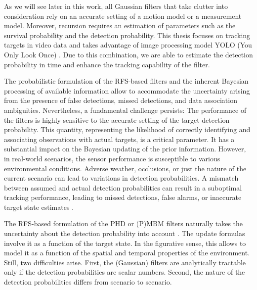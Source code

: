 As we will see later in this work, all Gaussian filters that take clutter into consideration rely on an accurate
setting
of a motion model or a measurement model. Moreover, recursion requires an estimation of parameters such as
the survival probability and the detection probability. This thesis focuses on tracking targets in video
data and takes advantage of image processing model YOLO (You Only Look Once) \cite{yanYolo2023}. Due to this combination, we are able to
estimate the detection probability in time and enhance the tracking capability of the filter.

The probabilistic formulation of the RFS-based filters and the inherent Bayesian processing of available information allow to accommodate the uncertainty arising from the presence of false detections, missed detections, and data association ambiguities. Nevertheless, a fundamental challenge persists: The performance of the filters is highly sensitive to the accurate setting of the target detection probability. This quantity, representing the likelihood of correctly identifying and associating observations with actual targets, is a critical parameter. It has a substantial impact on the Bayesian updating of the prior information.
However, in real-world scenarios, the sensor performance is susceptible to various environmental conditions. Adverse weather, occlusions, or just the nature of the current scenario can lead to variations in detection probabilities. A mismatch between assumed and actual detection probabilities can result in a suboptimal tracking performance, leading to missed detections, false alarms, or inaccurate target state estimates \cite{Hendeby2014Gaussian}.

The RFS-based formulation of the PHD or (P)MBM filters naturally takes the uncertainty about the detection
probability into account \cite{Hendeby2014Gaussian}. The update formulas involve it as a function of the target state. In the figurative sense, this allows to model it as \linebreak a function of the spatial and temporal properties of the environment.
Still, two difficulties arise. First, the (Gaussian) filters are analytically tractable only if the detection probabilities are scalar numbers. Second, the nature of the detection probabilities differs from scenario to scenario.

